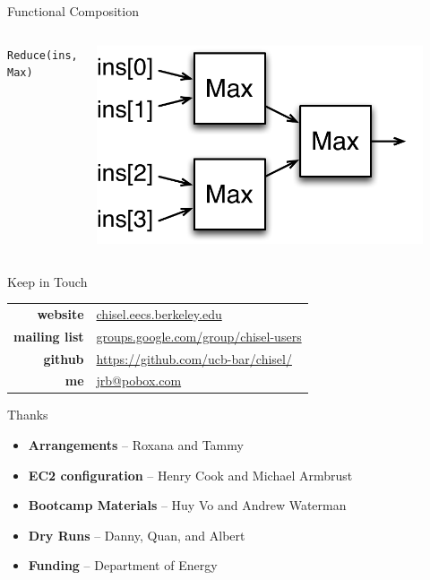 \documentclass[xcolor=pdflatex,dvipsnames,table]{beamer}
\begin{document}
\begin{frame}[fragile]{Functional Composition}
\begin{columns}
\verb+Reduce(ins, Max)+ \\
\begin{center}
\includegraphics[width=0.9\textwidth]{figs/reduce.pdf} \\
\end{center}


\end{columns}
\end{frame}

\begin{frame}[fragile]{Keep in Touch}
\begin{center}
\begin{tabular}{rl}
\textbf{website} & \url{chisel.eecs.berkeley.edu} \\
\textbf{mailing list} & \url{groups.google.com/group/chisel-users} \\
\textbf{github} & \url{https://github.com/ucb-bar/chisel/} \\
\textbf{me} & \url{jrb@pobox.com} \\
\end{tabular}
\end{center}
\end{frame}

\begin{frame}{Thanks}
\begin{itemize}
\item \textbf{Arrangements} -- Roxana and Tammy
\item \textbf{EC2 configuration} -- Henry Cook and Michael Armbrust 
\item \textbf{Bootcamp Materials} -- Huy Vo and Andrew Waterman
\item \textbf{Dry Runs} -- Danny, Quan, and Albert
\item \textbf{Funding} -- Department of Energy
\end{itemize}
\end{frame}
\end{document}
